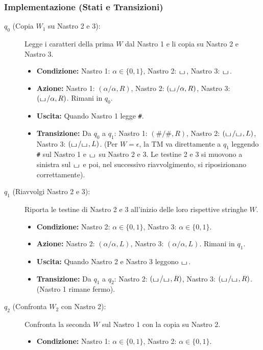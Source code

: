 \documentclass[a4paper]{article}
\theoremstyle{definition} %
\newcommand{\blankS}{\ensuremath{\raisebox{-0.15ex}{\scalebox{1.3}[0.7]{$\sqcup$}}\mkern2mu}}
\begin{document}
\subsubsection{Implementazione (Stati e Transizioni)}
\begin{description}
    \item[$q_0$ (Copia $W_1$ su Nastro 2 e 3):] Legge i caratteri della prima $W$ dal Nastro 1 e li copia su Nastro 2 e Nastro 3.
    \begin{itemize}
        \item \textbf{Condizione:} Nastro 1: $\alpha \in \{0,1\}$, Nastro 2: $\blankS$, Nastro 3: $\blankS$.
        \item \textbf{Azione:} Nastro 1: $(\alpha/\alpha, R)$, Nastro 2: $(\blankS/\alpha, R)$, Nastro 3: $(\blankS/\alpha, R)$. Rimani in $q_0$.
        \item \textbf{Uscita:} Quando Nastro 1 legge \texttt{\#}.
        \item \textbf{Transizione:} Da $q_0$ a $q_1$: Nastro 1: $(\#/\#, R)$, Nastro 2: $(\blankS/\blankS, L)$, Nastro 3: $(\blankS/\blankS, L)$. (Per $W=\epsilon$, la TM va direttamente a $q_1$ leggendo \texttt{\#} sul Nastro 1 e $\blankS$ su Nastro 2 e 3. Le testine 2 e 3 si muovono a sinistra sul $\blankS$ e poi, nel successivo riavvolgimento, si riposizionano correttamente).
    \end{itemize}
    \item[$q_1$ (Riavvolgi Nastro 2 e 3):] Riporta le testine di Nastro 2 e 3 all'inizio delle loro rispettive stringhe $W$.
    \begin{itemize}
        \item \textbf{Condizione:} Nastro 2: $\alpha \in \{0,1\}$, Nastro 3: $\alpha \in \{0,1\}$.
        \item \textbf{Azione:} Nastro 2: $(\alpha/\alpha, L)$, Nastro 3: $(\alpha/\alpha, L)$. Rimani in $q_1$.
        \item \textbf{Uscita:} Quando Nastro 2 e Nastro 3 leggono $\blankS$.
        \item \textbf{Transizione:} Da $q_1$ a $q_2$: Nastro 2: $(\blankS/\blankS, R)$, Nastro 3: $(\blankS/\blankS, R)$. (Nastro 1 rimane fermo).
    \end{itemize}
    \item[$q_2$ (Confronta $W_2$ con Nastro 2):] Confronta la seconda $W$ sul Nastro 1 con la copia su Nastro 2.
    \begin{itemize}
        \item \textbf{Condizione:} Nastro 1: $\alpha \in \{0,1\}$, Nastro 2: $\alpha \in \{0,1\}$.

\end{itemize}
\end{description}
\end{document}
